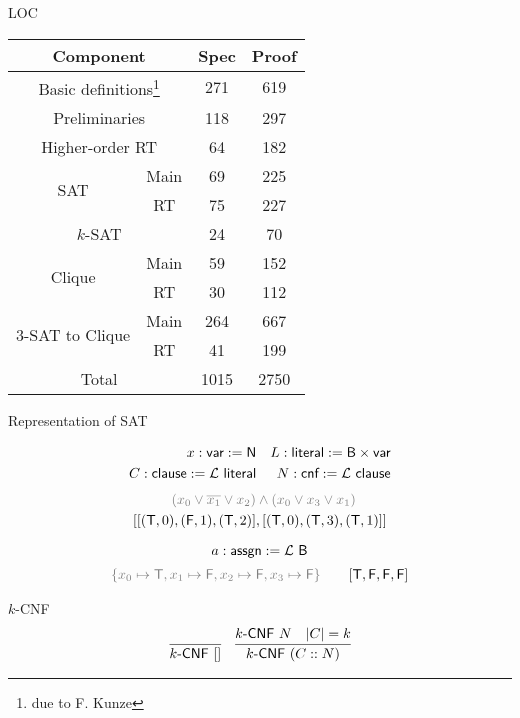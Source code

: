 \documentclass[11pt,usenames,dvipsnames,
  hyperref={pdfencoding=auto,psdextra}]{beamer}
\begin{document}
\begin{frame}{LOC}
  \begin{center}
  \begin{tabular}{cccc}
    \multicolumn{2}{c}{Component} & Spec & Proof \\
    \midrule
    \multicolumn{2}{c}{Basic definitions\footnote{due to F. Kunze}} & 271 & 619\\
    \multicolumn{2}{c}{Preliminaries} & 118 & 297 \\
    \multicolumn{2}{c}{Higher-order RT} & 64 & 182 \\
    \midrule
    \multirow{2}{*}{SAT} & Main & 69 & 225 \\
    & RT & 75 & 227 \\
    \midrule
    \multicolumn{2}{c}{$k$-SAT} & 24 & 70 \\
    \midrule
    \multirow{2}{*}{Clique} & Main & 59 & 152 \\
    & RT & 30 & 112 \\
    \midrule
    \multirow{2}{*}{3-SAT to Clique} & Main & 264 & 667 \\
    & RT & 41 & 199\\
    \midrule
    \multicolumn{2}{c}{Total} & 1015 & 2750

  \end{tabular}
  \end{center}
\end{frame}

\begin{frame}[allowframebreaks]{Representation of SAT}

\begin{align*}
  x : \textsf{var} := \mathsf{N}&& 
  L : \textsf{literal} := \textsf{B} \times \textsf{var} \\
  C : \textsf{clause} := \mathcal{L}~ \textsf{literal} &&
  N : \textsf{cnf} := \mathcal{L}~ \textsf{clause} 
\end{align*}
\begin{align*}
  \color{gray}(x_0 \lor \overline{x_1} \lor x_2) &\color{gray}\land (x_0 \lor x_3 \lor x_1)\\
  [[(\btrue, 0), (\bfalse, 1), (\btrue, 2)]&, [(\btrue, 0), (\btrue, 3), (\btrue, 1)]]
\end{align*}

\[ a : \textsf{assgn} := \mathcal{L}~ \textsf{B}\]
\begin{align*}   
  {\color{gray}\{x_0 \mapsto \btrue, x_1 \mapsto \bfalse, x_2 \mapsto \bfalse, x_3 \mapsto \bfalse\}}\qquad 
  [\btrue, \bfalse, \bfalse, \bfalse] 
\end{align*}

\pagebreak
\begin{block}{$k$-CNF}
\begin{align*}
\infer{\textsf{$k$-CNF}~[]}{} && \infer{\textsf{$k$-CNF}~(C::N)}{\textsf{$k$-CNF}~N \quad \length{C} = k} 
\end{align*}
\end{block}
\end{frame}
\end{document}
